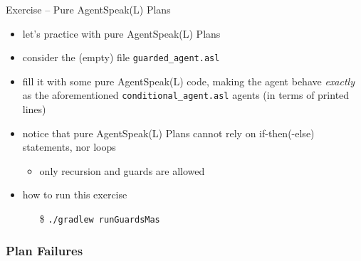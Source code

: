 \documentclass[presentation]{beamer}\mode<presentation>{\usetheme{AMSBolognaFC}}
\begin{document}
\begin{frame}[c, allowframebreaks]{Exercise \theJasonExample{} -- Pure AgentSpeak(L) Plans}
    \begin{itemize}
        \item let's practice with pure AgentSpeak(L) Plans
        
        \vspace{.3cm}
        
        
        \item consider the (empty) file \texttt{guarded\_agent.asl}
        
        \vspace{.3cm}
        
        \item fill it with some \alert{pure} AgentSpeak(L) code, making the agent behave \emph{exactly} as the aforementioned \texttt{conditional\_agent.asl} agents (in terms of printed lines)
        
        \vspace{.3cm}
        
        \item notice that pure AgentSpeak(L) Plans cannot rely on if-then(-else) statements, nor loops
        \begin{itemize}
            \item only recursion and guards are allowed
        \end{itemize}
        
        \vspace{.3cm}
        
        \item how to run this exercise
        \begin{itemize}
            \item[\$] \texttt{./gradlew run\alert{Guards}Mas}
        \end{itemize}
        
    \end{itemize}
\end{frame}

\subsubsection{Plan Failures}
\end{document}
